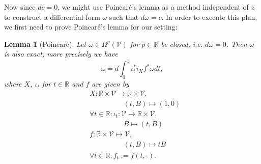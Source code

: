 \documentclass[b5paper,draft,openbib,12pt]{memoir}
\newtheorem{Lemma}[Def]{Lemma}
\begin{document}
Now since \(d c=0\), we might use Poincaré's lemma as a method independent of \(z\) to construct a differential form \(\omega\) such that \(d\omega=c\). 
In order to execute this plan, we first need to prove Poincaré's lemma for our setting:

\begin{Lemma}[Poincaré]\label{lem poincare}
Let \(\omega\in \Omega^p(\mathcal{V})\) for \(p\in\mathbb{R}\) be closed, i.e. \(d \omega =0\). Then \(\omega\) is also exact, more precisely we have
\begin{equation}
\omega=d \int_{0}^1 \iota^*_t i_X f^* \omega dt,
\end{equation}
where \(X\), \(\iota_t\) for \(t\in\mathbb{R}\) and \(f\) are given by
 \begin{align}
 &X: \mathbb{R}\times\mathcal{V}\rightarrow \mathbb{R}\times\mathcal{V},\\
 &\hspace{2cm} (t,B)\mapsto (1,0) \\
&\forall t \in \mathbb{R}: \iota_t: \mathcal{V}\rightarrow \mathbb{R}\times\mathcal{V},\\
&\hspace{2cm} B\mapsto (t,B)\\
&f:\mathbb{R}\times \mathcal{V}\mapsto \mathcal{V},\\
&\hspace{2cm} (t,B) \mapsto t B\\
 &\forall t \in \mathbb{R}: f_t:=f(t,\cdot).
 \end{align}
\end{Lemma}
\end{document}
